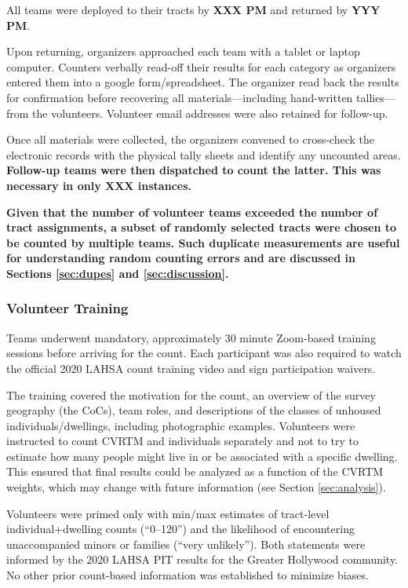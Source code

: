 \documentclass[11pt,twocolumn]{article}
\def\bfr{\bf\color{red}}
\def\Count{count}
\begin{document}
All teams were deployed to their tracts by {\bfr XXX PM} and returned by {\bfr YYY PM}.

Upon returning, organizers approached each team with a tablet or laptop computer. Counters 
verbally read-off their results for each category as organizers entered them into a google 
form/spreadsheet. The organizer read back the results for confirmation before recovering all 
materials---including hand-written tallies---from the volunteers. Volunteer email addresses 
were also retained for follow-up. 

Once all materials were collected, the organizers convened to cross-check the electronic records
with the physical tally sheets and identify any uncounted areas. {\bfr Follow-up teams were then 
dispatched to count the latter. This was necessary in only XXX instances.} 

{\bfr Given that the number of volunteer teams exceeded the number of tract assignments, a
subset of randomly selected tracts were chosen to be counted by multiple teams. Such duplicate 
measurements are useful for understanding random counting errors and are discussed in Sections 
\ref{sec:dupes} and \ref{sec:discussion}.}

\subsubsection{Volunteer Training}
\label{sec:training}

Teams underwent mandatory, approximately 30 minute Zoom-based training sessions before arriving 
for the \Count. Each participant was also required to watch the official 2020 LAHSA count training video 
and sign participation waivers.

The training covered the motivation for the \Count, an overview of the survey geography (the CoCs), 
team roles, and descriptions of the classes of unhoused individuals/dwellings, including photographic 
examples. Volunteers were instructed to count CVRTM and individuals separately and not to try to 
estimate how many people might live in or be associated with a specific dwelling. This ensured that 
final results could be analyzed as a function of the CVRTM weights, which may change with future 
information (see Section \ref{sec:analysis}).

Volunteers were primed only with min/max estimates of tract-level individual+dwelling counts 
(``0--120'') and the likelihood of encountering unaccompanied minors or families (``very unlikely''). 
Both statements were informed by the 2020 LAHSA PIT results for the Greater Hollywood 
community. No other prior count-based information was established to minimize biases.
\end{document}
